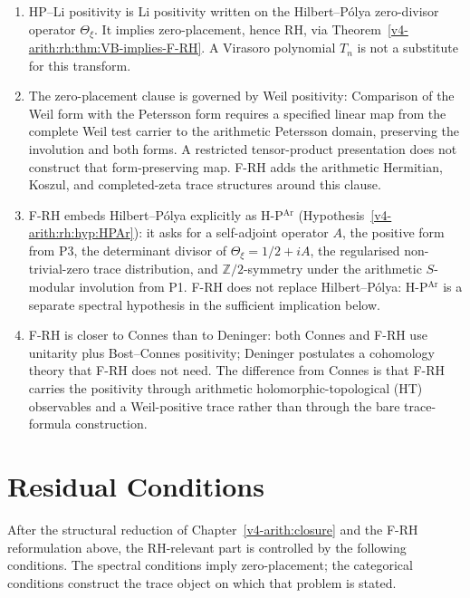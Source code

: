 \begin{remark}[relations]
\label{v4-arith:rh:rem:comparison-relations}
\begin{enumerate}
\item HP--Li positivity is Li positivity written on the
Hilbert--P\'olya zero-divisor operator \(\Theta_{\xi}\). It implies
zero-placement, hence RH, via
Theorem~\ref{v4-arith:rh:thm:VB-implies-F-RH}. A Virasoro polynomial
\(T_{n}\) is not a substitute for this transform.
\item The zero-placement clause is governed by Weil positivity:
Comparison of the Weil form with the Petersson form requires a
specified linear map from the complete Weil test carrier to the
arithmetic Petersson domain, preserving the involution and both
forms. A restricted tensor-product presentation does not construct
that form-preserving map. F-RH adds the arithmetic Hermitian, Koszul, and
completed-zeta trace structures around this clause.
\item F-RH embeds Hilbert--P\'olya explicitly as H-P\(^{\mathrm{Ar}}\)
(Hypothesis~\ref{v4-arith:rh:hyp:HPAr}): it asks for a self-adjoint operator
\(A\), the positive form from P3, the determinant divisor of
\(\Theta_{\xi}=1/2+iA\), the
regularised non-trivial-zero trace distribution, and
\(\mathbb{Z}/2\)-symmetry under the arithmetic
\(S\)-modular involution from P1. F-RH does not replace
Hilbert--P\'olya: H-P\(^{\mathrm{Ar}}\) is a separate spectral
hypothesis in the sufficient implication below.
\item F-RH is closer to Connes than to Deninger: both Connes and
F-RH use unitarity plus Bost--Connes positivity; Deninger
postulates a cohomology theory that F-RH does not need. The
difference from Connes is that F-RH carries the positivity
through arithmetic holomorphic-topological (HT) observables and a
Weil-positive trace rather than through the bare trace-formula construction.
\end{enumerate}
\end{remark}

\section{Residual Conditions}
\label{v4-arith:rh:residual}

After the structural reduction of Chapter~\ref{v4-arith:closure} and the
F-RH reformulation above, the RH-relevant part is controlled by the
following conditions.  The spectral conditions imply zero-placement;
the categorical conditions construct the trace object on which that
problem is stated.

